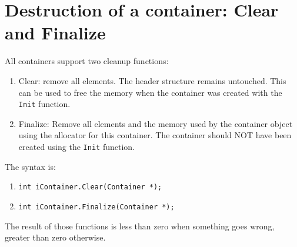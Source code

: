 \documentclass[12pt,a4paper]{memoir} %
\begin{document}
\section{Destruction of a container: Clear and Finalize}
All containers support two cleanup functions:
	\begin{enumerate}
\item
Clear: remove all elements. The header structure remains untouched. This can be used to free the memory when the container was created with the \texttt{Init} function.
\item
Finalize: Remove all elements and the memory used by the container object using the allocator for this container. The container should NOT have been created using the \texttt{Init} function.
\end{enumerate}
The syntax is:
\begin{enumerate}
\item \texttt{int iContainer.Clear(Container *);}
\item \texttt{int iContainer.Finalize(Container *);}
\end{enumerate}
The result of those functions is less than zero when something goes wrong, greater than zero otherwise.
\end{document}
